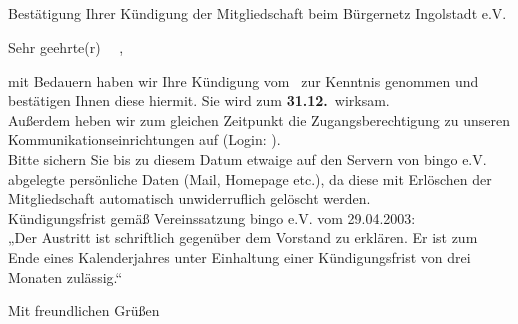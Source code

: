\documentclass{bingoevletter}
\begin{document}
\begin{letter}{%
		\Anrede \\
		\Vorname \ \Nachname\\
		\Adresse\\
		\PLZ \ \Ort%
	}
	\opening{Bestätigung Ihrer Kündigung der Mitgliedschaft beim Bürgernetz Ingolstadt e.V.}
	
	Sehr geehrte(r) \Anrede \ \Vorname \ \Nachname, 
	
	mit Bedauern haben wir Ihre Kündigung vom \textbf{\EingangDatum}\ zur Kenntnis genommen und bestätigen Ihnen diese hiermit. Sie wird zum \textbf{31.12.\AustrittJahr}\ wirksam. \\
	
	Außerdem heben wir zum gleichen Zeitpunkt die Zugangsberechtigung zu unseren Kommunikationseinrichtungen auf (Login: \Login). \\
	Bitte sichern Sie bis zu diesem Datum etwaige auf den Servern von bingo e.V. abgelegte persönliche Daten (Mail, Homepage etc.), da diese mit Erlöschen der Mitgliedschaft automatisch unwiderruflich gelöscht werden. \\
	
	
	Kündigungsfrist gemäß Vereinssatzung bingo e.V. vom 29.04.2003: \\
	„Der Austritt ist schriftlich gegenüber dem Vorstand zu erklären. Er ist zum Ende eines Kalenderjahres unter Einhaltung einer Kündigungsfrist von drei Monaten zulässig.“ \\
	\closing{Mit freundlichen Grüßen}
\end{letter}	
\end{document}
